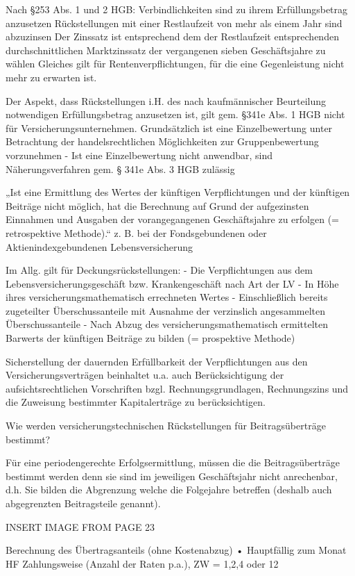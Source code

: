 Nach §253 Abs. 1 und 2 HGB:
Verbindlichkeiten sind zu ihrem Erfüllungsbetrag anzusetzen
Rückstellungen mit einer Restlaufzeit von mehr als einem Jahr sind abzuzinsen
Der Zinssatz ist entsprechend dem der Restlaufzeit entsprechenden durchschnittlichen Marktzinssatz der vergangenen sieben Geschäftsjahre zu
wählen
Gleiches gilt für Rentenverpflichtungen, für die eine Gegenleistung nicht mehr zu erwarten ist.

Der Aspekt, dass Rückstellungen i.H. des nach kaufmännischer Beurteilung notwendigen Erfüllungsbetrag anzusetzen ist, gilt gem. §341e
Abs. 1 HGB nicht für Versicherungsunternehmen.
Grundsätzlich ist eine Einzelbewertung unter Betrachtung der handelsrechtlichen Möglichkeiten zur Gruppenbewertung vorzunehmen
- Ist eine Einzelbewertung nicht anwendbar, sind Näherungsverfahren gem. § 341e Abs. 3 HGB zulässig

„Ist eine Ermittlung des Wertes der künftigen Verpflichtungen und der künftigen Beiträge nicht möglich, hat die Berechnung auf Grund der aufgezinsten
Einnahmen und Ausgaben der vorangegangenen Geschäftsjahre zu erfolgen (= retrospektive Methode).“
z. B. bei der Fondsgebundenen oder Aktienindexgebundenen Lebensversicherung

Im Allg. gilt für Deckungsrückstellungen:
- Die Verpflichtungen aus dem Lebensversicherungsgeschäft bzw. Krankengeschäft nach Art der LV
-  In Höhe ihres versicherungsmathematisch errechneten Wertes
- Einschließlich bereits zugeteilter Überschussanteile mit Ausnahme der verzinslich angesammelten Überschussanteile
- Nach Abzug des versicherungsmathematisch ermittelten Barwerts der künftigen Beiträge zu bilden (= prospektive Methode)

Sicherstellung der dauernden Erfüllbarkeit der Verpflichtungen aus den Versicherungsverträgen beinhaltet u.a. auch 
Berücksichtigung der aufsichtsrechtlichen Vorschriften bzgl. Rechnungsgrundlagen, 
Rechnungszins und die Zuweisung bestimmter Kapitalerträge zu berücksichtigen.


Wie werden versicherungstechnischen Rückstellungen für Beitragsüberträge bestimmt?

Für eine periodengerechte Erfolgsermittlung, müssen die die Beitragsüberträge bestimmt werden denn sie sind im jeweiligen Geschäftsjahr
nicht anrechenbar, d.h. Sie bilden die Abgrenzung welche die Folgejahre betreffen (deshalb auch abgegrenzten Beitragsteile genannt). 

INSERT IMAGE FROM PAGE 23

Berechnung des Übertragsanteils (ohne Kostenabzug)
• Hauptfällig zum Monat HF
Zahlungsweise (Anzahl der Raten p.a.), ZW = 1,2,4 oder 12

